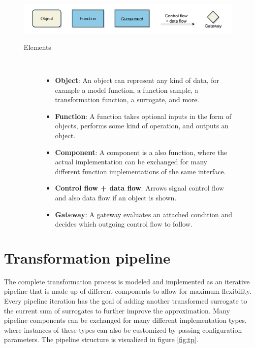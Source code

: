 \documentclass[
  a4paper,  %
  twoside,  %
  bibliography=totoc,
  headsepline,
  cleardoublepage=empty,
  parskip=half,
  draft=false
]{scrbook}
\begin{document}
\begin{mdframed}[style=style,frametitle={Notation}]
\begin{figure}[H]

\includegraphics[width=\textwidth]{graphics/definitions.pdf}
\vspace{-7.5mm}

\delimit

\vspace{3.5mm}

\begin{description}
\item[Elements] {~ \begin{itemize}[\null]
\item \textbf{Object}: An object can represent any kind of data, for example a model function, a function sample, a transformation function, a surrogate, and more.
\item \textbf{Function}: A function takes optional inputs in the form of objects, performs some kind of operation, and outputs an object.
\item \textbf{Component}: A component is a also function, where the actual implementation can be exchanged for many different function implementations of the same interface.
\item \textbf{Control flow + data flow}: Arrows signal control flow and also data flow if an object is shown.
\item \textbf{Gateway}: A gateway evaluates an attached condition and decides which outgoing control flow to follow.
\end{itemize}}
\end{description}

\delimit

\label{fig:defs}
\end{figure}
\end{mdframed}


\newpage
\section{Transformation pipeline}
\label{sec:tp}

The complete transformation process is modeled and implemented as an iterative pipeline that is made up of different components to allow for maximum flexibility.
Every pipeline iteration has the goal of adding another transformed surrogate to the current sum of surrogates to further improve the approximation.
Many pipeline components can be exchanged for many different implementation types, where instances of these types can also be customized by passing configuration parameters.
The pipeline structure is visualized in figure \cref{fig:tp}.
\end{document}
